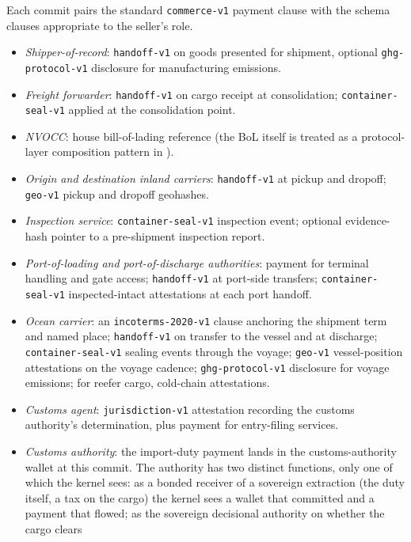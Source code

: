 \documentclass[11pt,a4paper]{article}
\theoremstyle{definition}
\theoremstyle{remark}
\begin{document}
Each commit pairs the standard \texttt{commerce-v1} payment
clause with the schema clauses appropriate to the seller's role.

\begin{itemize}
  \item \emph{Shipper-of-record}: \texttt{handoff-v1} on goods
    presented for shipment, optional \texttt{ghg-protocol-v1}
    disclosure for manufacturing emissions.
  \item \emph{Freight forwarder}: \texttt{handoff-v1} on cargo
    receipt at consolidation; \texttt{container-seal-v1} applied
    at the consolidation point.
  \item \emph{NVOCC}: house bill-of-lading reference (the BoL
    itself is treated as a protocol-layer composition pattern in
    ).
  \item \emph{Origin and destination inland carriers}:
    \texttt{handoff-v1} at pickup and dropoff;
    \texttt{geo-v1} pickup and dropoff geohashes.
  \item \emph{Inspection service}:
    \texttt{container-seal-v1} inspection event; optional
    evidence-hash pointer to a pre-shipment inspection report.
  \item \emph{Port-of-loading and port-of-discharge authorities}:
    payment for terminal handling and gate access;
    \texttt{handoff-v1} at port-side transfers;
    \texttt{container-seal-v1} inspected-intact attestations at
    each port handoff.
  \item \emph{Ocean carrier}: an \texttt{incoterms-2020-v1}
    clause anchoring the shipment term and named place;
    \texttt{handoff-v1} on transfer to the vessel and at
    discharge; \texttt{container-seal-v1} sealing events through
    the voyage; \texttt{geo-v1} vessel-position attestations on
    the voyage cadence; \texttt{ghg-protocol-v1} disclosure for
    voyage emissions; for reefer cargo, cold-chain attestations.
  \item \emph{Customs agent}: \texttt{jurisdiction-v1}
    attestation recording the customs authority's determination,
    plus payment for entry-filing services.
  \item \emph{Customs authority}: the import-duty payment lands
    in the customs-authority wallet at this commit. The authority
    has two distinct functions, only one of which the kernel
    sees: as a bonded receiver of a sovereign extraction
    (the duty itself, a tax on the cargo) the kernel sees a
    wallet that committed and a payment that flowed; as the
    sovereign decisional authority on whether the cargo clears

\end{itemize}
\end{document}
